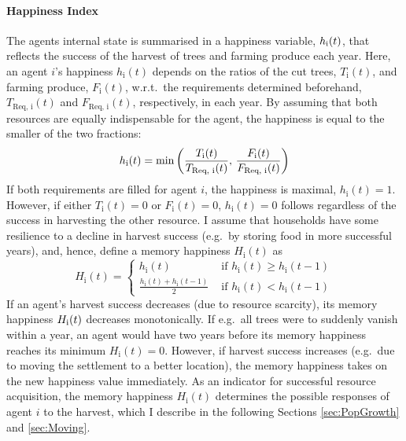 \paragraph{Happiness Index}
The agents internal state is summarised in a happiness variable, $h_{\rm i}(t)$, that reflects the success of the harvest of trees and farming produce each year.
Here, an agent $i$'s happiness $h_\text{i}(t)$ depends on the ratios of the cut trees, $T_\text{i}(t)$, and farming produce, $F_\text{i}(t)$, w.r.t.\ the requirements determined beforehand, $T_\text{Req, i}(t)$ and $F_\text{Req, i}(t)$, respectively, in each year.
By assuming that both resources are equally indispensable for the agent, the happiness is equal to the smaller of the two fractions:
\begin{equation} 
h_\text{i}(t) = {\rm min} \left( \frac{T_\text{i}(t)}{T_\text{Req, i}(t)}, \, \frac{F_\text{i}(t)}{F_\text{Req, i}(t)} \right)
\label{eq:h_i}
\end{equation}
If both requirements are filled for agent $i$, the happiness is maximal,  $h_\text{i}(t)=1$.
However, if either $T_\text{i}(t)=0$ or $F_\text{i}(t)=0$, $h_\text{i}(t)=0$ follows regardless of the success in harvesting the other resource.
I assume that households have some resilience to a decline in harvest success (e.g.\ by storing food in more successful years), and, hence, define a memory happiness $H_\text{i}(t)$ as
\begin{equation}
H_\text{i}(t) = \begin{cases} 
				h_\text{i}(t) & \text{ if } h_\text{i}(t)\geq h_\text{i}(t-1) \\
				\frac{h_\text{i}(t) + h_\text{i}(t-1)}{2} & \text{ if } h_\text{i}(t)<h_\text{i}(t-1) 
		\end{cases}
\end{equation}
If an agent's harvest success decreases (due to resource scarcity), its memory happiness $H_{\rm i}(t)$ decreases monotonically.
If e.g.\ all trees were to suddenly vanish within a year, an agent would have two years before its memory happiness reaches its minimum $H_\text{i}(t) = 0$.
However, if harvest success increases (e.g.\ due to moving the settlement to a better location), the memory happiness takes on the new happiness value immediately.
As an indicator for successful resource acquisition, the memory happiness $H_\text{i}(t)$ determines the possible responses of agent $i$ to the harvest, which I describe in the following Sections \ref{sec:PopGrowth} and \ref{sec:Moving}.

